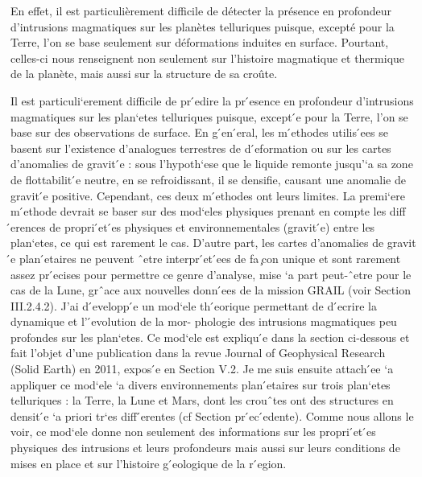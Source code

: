En effet, il est particulièrement difficile de détecter la présence en
profondeur  d'intrusions  magmatiques  sur  les  planètes  telluriques
puisque,  excepté   pour  la  Terre,   l'on  se  base   seulement  sur
déformations induites en surface. Pourtant, celles-ci nous renseignent
non seulement sur  l’histoire magmatique et thermique  de la planète,
mais aussi sur la structure de sa croûte.


Il  est  particuli`erement difficile  de  pr  ́edire  la pr  ́esence  en
profondeur  d’intrusions  magmatiques  sur les  plan`etes  telluriques
puisque, except ́e pour la Terre,  l’on se base sur des observations de
surface.   En g  ́en  ́eral, les  m  ́ethodes utilis  ́ees  se basent  sur
l’existence d’analogues terrestres  de d ́eformation ou  sur les cartes
d’anomalies de  gravit ́e  : sous l’hypoth`ese  que le  liquide remonte
jusqu’`a sa zone  de flottabilit ́e neutre, en se  refroidissant, il se
densifie, causant une  anomalie de gravit ́e  positive.  Cependant, ces
deux m  ́ethodes ont leurs  limites. La  premi`ere m ́ethode  devrait se
baser sur des mod`eles physiques prenant en compte les diff ́erences de
propri  ́et ́es  physiques  et environnementales  (gravit  ́e) entre  les
plan`etes,  ce qui  est rarement  le  cas.  D’autre  part, les  cartes
d’anomalies de gravit  ́e plan ́etaires ne peuvent ˆetre  interpr ́et ́ees
de fa  ̧con unique et sont  rarement assez pr ́ecises  pour permettre ce
genre  d’analyse, mise  `a part  peut-ˆetre pour  le cas  de la  Lune,
grˆace  aux nouvelles  donn  ́ees  de la  mission  GRAIL (voir  Section
III.2.4.2). J’ai  d ́evelopp ́e  un mod`ele  th ́eorique permettant  de d
́ecrire la dynamique et l’ ́evolution de la mor- phologie des intrusions
magmatiques peu profondes sur les  plan`etes. Ce mod`ele est expliqu ́e
dans la section  ci-dessous et fait l’objet d’une  publication dans la
revue Journal of  Geophysical Research (Solid Earth) en  2011, expos ́e
en Section V.2.  Je me suis  ensuite attach ́ee `a appliquer ce mod`ele
`a   divers   environnements   plan  ́etaires   sur   trois   plan`etes
telluriques :  la Terre, la  Lune et Mars,  dont les crouˆtes  ont des
structures en densit ́e `a priori  tr`es diff ́erentes (cf Section pr ́ec
́edente). Comme nous allons le voir, ce mod`ele donne non seulement des
informations sur  les propri ́et  ́es physiques des intrusions  et leurs
profondeurs mais aussi  sur leurs conditions de mises en  place et sur
l’histoire g ́eologique de la r ́egion.


